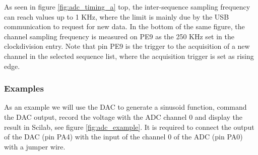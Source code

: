 \documentclass[letterpaper,10pt,english]{hitec}
\begin{document}
As seen in figure \ref{fig:adc_timing_a} top, the inter-sequence sampling frequency can reach values up to 1 KHz, where the limit is mainly due by the USB communication to request for new data.
In the bottom of the same figure, the channel sampling frequency is measured on PE9 as the 250 KHz set in the clockdivision entry. Note that pin PE9 is the trigger to the acquisition of a new channel in the selected sequence list, where the acquisition trigger is set as rising edge.


\subsubsection{Examples}

As an example we will use the DAC to generate a sinusoid function, command the DAC output, record the voltage with the ADC channel 0 and display the result in Scilab, see figure \ref{fig:adc_example}.
It is required to connect the output of the DAC (pin PA4) with the input of the channel 0 of the ADC (pin PA0) with a jumper wire.
\end{document}

